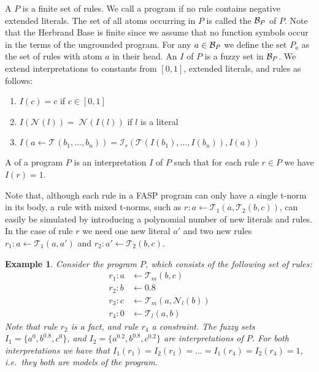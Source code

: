 \documentclass{tlp}
\newcommand{\hbase}[1]{{\ensuremath{{\cal B}_{#1}}}}
\newcommand{\fneg}[2]{\ensuremath{\mathcal{N}_{#1}(#2)}}
\newcommand{\lneg}[1]{\fneg{l}{#1}}
\newcommand{\bodyfand}[1]{\pretnorm_{#1}}
\newcommand{\rulefimp}[1]{\prefimp_{#1}}
\newcommand{\pretnorm}{\mathcal{T}}
\newcommand{\prefimp}{\mathcal{I}}
\newtheorem{example}{Example}
\begin{document}
 A  $P$ is a finite set of rules. We call a program  if no rule contains negative extended literals. The set of all atoms occurring in $P$ is called the  $\hbase{P}$ of $P$. Note that the Herbrand Base is finite since we assume that no function symbols occur in the terms of the ungrounded program. For any $a \in \hbase{P}$ we define the set $P_a$ as the set of rules with atom $a$ in their head. An  $I$ of $P$ is a fuzzy set in $\hbase{P}$. We extend interpretations to constants from $[0,1]$, extended literals, and rules as follows:
 \begin{enumerate}
   \item $I(c) = c$ if $c \in [0,1]$
   \item $I(\fneg{}{l}) = \;\fneg{}{I(l)}$ if $l$ is a literal
   \item $I(a \gets \bodyfand{}(b_1,\ldots,b_n)) = \rulefimp{r}(\bodyfand{}(I(b_1),\ldots,I(b_n)),I(a))$
\end{enumerate}
 A  of a program $P$ is an interpretation $I$ of $P$ such that for each rule $r \in P$ we have $I(r) = 1$.


 Note that, although each rule in a FASP program can only have a single t-norm in its body, a rule with mixed t-norms, such as $r: a \gets \pretnorm_1(a,\pretnorm_2(b,c))$, can easily be simulated by introducing a polynomial number of new literals and rules. In the case of rule $r$ we need one new literal $a'$ and two new rules $r_1: a \gets \pretnorm_1(a,a')$ and $r_2: a' \gets \pretnorm_2(b,c)$.
 






\begin{example}\label{ex:prog1}
 Consider the program $P$, which consists of the following set of rules:
 \begin{align*}
  r_{1}: a &\gets \pretnorm_m(b,c)\\
  r_{2}: b &\gets 0.8\\
  r_{3}: c &\gets \pretnorm_m(a,\lneg{b})\\
  r_{4}: 0 &\gets \pretnorm_l(a,b)
 \end{align*}
 Note that rule $r_2$ is a fact, and rule $r_4$ a constraint.
The fuzzy sets $I_{1} = \{ a^{0}, b^{0.8}, c^{0} \}$, and $I_{2} = \{ a^{0.2}, b^{0.8}, c^{0.2} \}$ are interpretations of $P$.
For both interpretations we have that $I_1(r_1) = I_2(r_1) = \ldots = I_1(r_4) = I_2(r_4) = 1$, i.e.~they both are models of the program.
\end{example}
\end{document}
